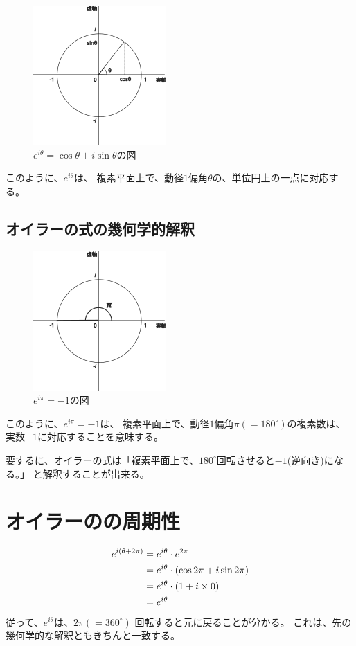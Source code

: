 \documentclass[12pt,a4paper,fleqn]{ltjsarticle}
\begin{document}
\begin{figure}[h]
  \includegraphics{circle.png}
    \caption{$e^{i\theta}=\cos\theta+i\sin\theta$の図}
\end{figure}

このように、$e^{i\theta}$は、
複素平面上で、動径$1$偏角$\theta$の、単位円上の一点に対応する。

\subsection{オイラーの式の幾何学的解釈}
\begin{figure}[h]
    \includegraphics{circle-pi.png}
    \caption{$e^{i\pi}=-1$の図}
\end{figure}
このように、$e^{i\pi}=-1$は、
複素平面上で、動径$1$偏角$\pi(=180^{\circ})$の複素数は、実数$-1$に対応することを意味する。

要するに、オイラーの式は「複素平面上で、$180^\circ$回転させると$-1$(逆向き)になる。」
と解釈することが出来る。

\newpage

\section{オイラーのの周期性}
\begin{spacing}{0.3}
  \begin{align}
        e^{i(\theta+2\pi)} &= e^{i\theta}\cdot e^{2\pi} \notag \\
                           &= e^{i\theta}\cdot (\cos 2\pi + i\sin 2\pi) \notag \\
                           &= e^{i\theta}\cdot (1 + i \times 0) \notag \\
                           &= e^{i\theta} \notag
    \end{align}
    従って、$e^{i\theta}$は、$2\pi(=360^{\circ})$ 回転すると元に戻ることが分かる。
    これは、先の幾何学的な解釈ともきちんと一致する。
\end{spacing}
\end{document}
